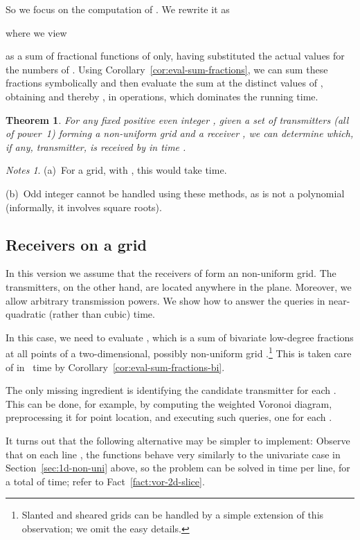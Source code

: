\documentclass[11pt]{article}
\newtheorem{theorem}{Theorem}[section]
\theoremstyle{remark}
\newtheorem*{notes}{Notes}
\begin{document}
So we focus on the computation of .  We rewrite it as
 
where we view

as a sum of fractional functions of  only, having substituted the actual
values for the numbers of .  Using
Corollary~\ref{cor:eval-sum-fractions}, we can sum these fractions symbolically and then 
evaluate the sum at the  distinct values  of ,
obtaining  and thereby , in 
 operations, which dominates the running
time.

\begin{theorem}
  \label{th:2d-transmitters-on-grid}
  For any fixed positive even integer , given a set  of 
  transmitters (all of power~1) forming a  non-uniform grid and
	a receiver , we can determine
  which, if any, transmitter, is received by  in
  time .
\end{theorem}

\begin{notes}
  (a)~For a  grid, with , this would take  time.

  (b)~Odd integer  cannot be handled using these methods, as  is not a polynomial (informally, it involves square roots).
\end{notes}

\subsection{Receivers on a grid}
\label{sec:rec-grid}
In this version we assume that the receivers of  form an  non-uniform grid.
The  transmitters, on the other hand, are located anywhere in the plane. Moreover, we allow arbitrary transmission powers.
We show how to answer the  queries in near-quadratic (rather than  cubic) time.

In this case, we need to evaluate , which is a sum of 
bivariate low-degree fractions at all points  of a
two-dimensional, possibly non-uniform grid .\footnote{Slanted and sheared grids can be handled by a simple
  extension of this observation; we omit the easy details.}
This is taken care of in~ time by
Corollary~\ref{cor:eval-sum-fractions-bi}.

The only missing ingredient is identifying the candidate transmitter
 for each .  This can be done, for example,
by computing the weighted Voronoi diagram, preprocessing it for point
location, and executing  such queries, one for each .  

It turns out that the following alternative may be 
simpler to implement: Observe that on each line , the
functions  behave very similarly to the
univariate case in Section~\ref{sec:1d-non-uni} above, so the problem
can be solved in  time per line, for a total of  time; refer to Fact~\ref{fact:vor-2d-slice}.
\end{document}
